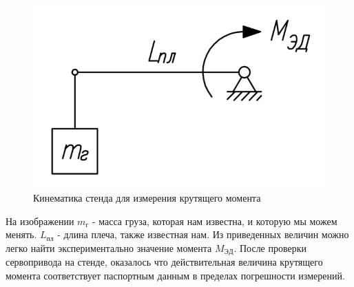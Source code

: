 \begin{figure}[ht]
    \centering
    \includegraphics[scale=0.7]{kin3.png}
    \caption{Кинематика стенда для измерения крутящего момента}
\end{figure}

На изображении $ m_г $ - масса груза, которая нам известна, и которую мы можем менять. $ L_{пл} $ - длина плеча, также известная нам. Из приведенных величин можно легко найти экспериментально значение момента $ M_ {ЭД} $. После проверки сервопривода на стенде, оказалось что действительная величина крутящего момента соответствует паспортным данным в пределах погрешности измерений.